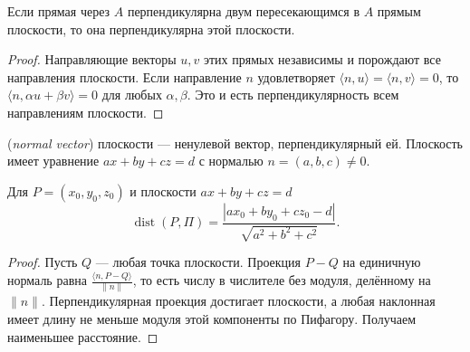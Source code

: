 \begin{theorem}
Если прямая через \(A\) перпендикулярна двум пересекающимся в \(A\) прямым плоскости, то она перпендикулярна этой плоскости.
\end{theorem}
\begin{proof}Направляющие векторы \(u,v\) этих прямых независимы и порождают все направления плоскости. Если направление \(n\) удовлетворяет \(\langle n,u\rangle=\langle n,v\rangle=0\), то \(\langle n,\alpha u+\beta v\rangle=0\) для любых \(\alpha,\beta\). Это и есть перпендикулярность всем направлениям плоскости.\end{proof}
\begin{definition} (\emph{normal vector}) плоскости — ненулевой вектор, перпендикулярный ей. Плоскость имеет уравнение \(ax+by+cz=d\) с нормалью \(n=(a,b,c)\ne0\).\end{definition}
\begin{theorem}
Для \(P=(x_0,y_0,z_0)\) и плоскости \(ax+by+cz=d\)
\[
\operatorname{dist}(P,\Pi)=
\frac{|ax_0+by_0+cz_0-d|}{\sqrt{a^2+b^2+c^2}}.
\]
\end{theorem}
\begin{proof}Пусть \(Q\) — любая точка плоскости. Проекция \(P-Q\) на единичную нормаль равна \(\frac{\langle n,P-Q\rangle}{\|n\|}\), то есть числу в числителе без модуля, делённому на \(\|n\|\). Перпендикулярная проекция достигает плоскости, а любая наклонная имеет длину не меньше модуля этой компоненты по Пифагору. Получаем наименьшее расстояние.\end{proof}
